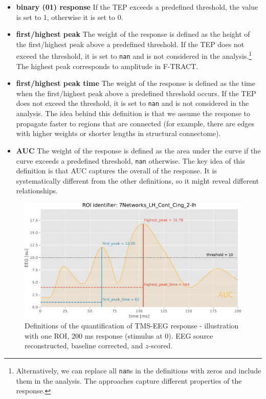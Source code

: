 \begin{itemize}
    \item \textbf{binary (01) response} If the TEP exceeds a predefined threshold, the value is set to 1, otherwise it is set to 0.
    \item \textbf{first/highest peak} The weight of the response is defined as the height of the first/highest peak above a predefined threshold. If the TEP does not exceed the threshold, it is set to \texttt{nan} and is not considered in the analysis.\footnote{Alternatively, we can replace all \texttt{nan}s in the definitions with zeros and include them in the analysis. The approaches capture different properties of the response.} The highest peak corresponds to amplitude in F-TRACT. 
    \item \textbf{first/highest peak time} The weight of the response is defined as the time when the first/highest peak above a predefined threshold occurs. If the TEP does not exceed the threshold, it is set to \texttt{nan} and is not considered in the analysis. The idea behind this definition is that we assume the response to propagate faster to regions that are  connected (for example, there are edges with higher weights or shorter lengths in structural connectome).
    \item \textbf{AUC} The weight of the response is defined as the area under the curve if the curve exceeds a predefined threshold, \texttt{nan} otherwise. The key idea of this definition is that AUC captures the overall  of the response. It is systematically different from the other definitions, so it might reveal different relationships.
\end{itemize}

\begin{figure}
    \centering
    \includegraphics[width=\textwidth]{images/nootebook_generated/pytepfit_results/simulated/200/not_over_threshold_nan/7Networks_LH_Cont_Cing_2-lh_response_def.pdf}
    \caption[TMS-EEG response definitions -- illustration]{Definitions of the quantification of TMS-EEG response - illustration with one ROI, 200 ms response (stimulus at 0). EEG source reconstructed, baseline corrected, and $z$-scored.}
    \label{fig:tms-respondse-definition}
\end{figure}

